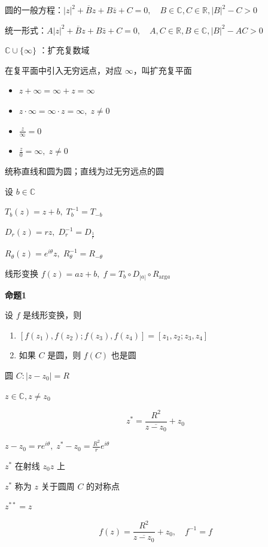 圆的一般方程：\(|z|^{2}+\overline{B}z+B\bar{z}+C=0, \quad B \in \mathbb{C},C\in \mathbb{R},|B|^{2}-C>0\)

统一形式：\(A|z|^{2}+\overline{B}z+B\bar{z}+C=0, \quad A,C\in \mathbb{R},B\in \mathbb{C},|B|^{2}-AC>0\)

\(\mathbb{C} \cup \{ \infty \}\) ：扩充复数域

在复平面中引入无穷远点，对应 \(\infty\)，叫扩充复平面

\begin{itemize}
\tightlist
\item
  \(z+\infty=\infty+z=\infty\)
\item
  \(z \cdot \infty=\infty \cdot z=\infty, \; z\neq 0\)
\item
  \(\frac{z}{\infty}=0\)
\item
  \(\frac{z}{0}=\infty, \; z\neq 0\)
\end{itemize}

统称直线和圆为圆；直线为过无穷远点的圆

设 \(b \in \mathbb{C}\)

\(T_{b}(z)=z+b, \; T_{b}^{-1}=T_{-b}\)

\(D_{r}(z)=rz, \; D_{r}^{-1}=D_{\frac{1}{r}}\)

\(R_{\theta}(z)=e^{i\theta}z, \; R_{\theta}^{-1}=R_{-\theta}\)

线形变换 \(f(z)=az+b, \; f=T_{b} \circ D_{|a|} \circ R_{\mathrm{arg}a}\)

\textbf{命题1}

设 \(f\) 是线形变换，则

\begin{enumerate}
\def\labelenumi{\arabic{enumi}.}
\tightlist
\item
  \([f(z_{1}),f(z_{2});f(z_{3}),f(z_{4})]=[z_{1},z_{2};z_{3},z_{4}]\)
\item
  如果 \(C\) 是圆，则 \(f(C)\) 也是圆
\end{enumerate}

圆 \(C: |z-z_{0}|=R\)

\(z \in \mathbb{C}, z\neq{}z_{0}\)

\[
z^{*}=\frac{R^{2}}{\overline{z-z_{0}}}+z_{0}
\]

\(z-z_{0}=re^{i\theta}, \; z^{*}-z_{0}=\frac{R^{2}}{r}e^{i\theta}\)

\(z^{*}\) 在射线 \(z_{0}z\) 上

\(z^{*}\) 称为 \(z\) 关于圆周 \(C\) 的对称点

\(z^{**}=z\)

\[
f(z)=\frac{R^{2}}{\overline{z-z_{0}}}+z_{0},\quad f^{-1}=f
\]


